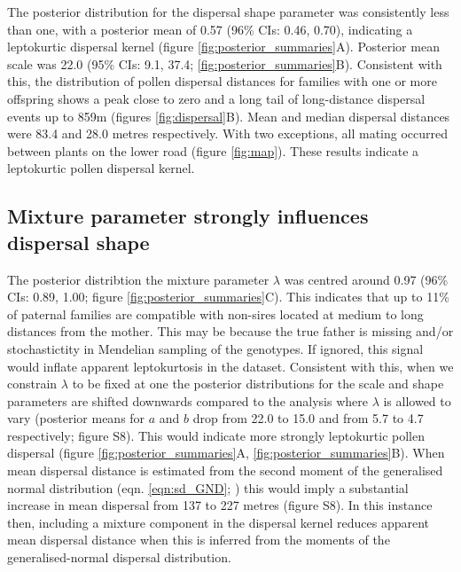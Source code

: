 \documentclass[10pt, a4paper, twocolumn]{article} %
\begin{document}
The posterior distribution for the dispersal shape parameter was consistently less than one, with a posterior mean of 0.57 (96\% CIs: 0.46, 0.70), indicating a leptokurtic dispersal kernel (figure \ref{fig:posterior_summaries}A).
Posterior mean scale was 22.0 (95\% CIs: 9.1, 37.4; \ref{fig:posterior_summaries}B).
Consistent with this, the distribution of pollen dispersal distances for families with one or more offspring shows a peak close to zero and a long tail of long-distance dispersal events up to 859m (figures \ref{fig:dispersal}B).
Mean and median dispersal distances were 83.4 and 28.0 metres respectively.
With two exceptions, all mating occurred between plants on the lower road (figure \ref{fig:map}).
These results indicate a leptokurtic pollen dispersal kernel.


\subsection{Mixture parameter strongly influences dispersal shape}

The posterior distribtion the mixture parameter $\lambda$ was centred around 0.97 (96\% CIs: 0.89, 1.00; figure \ref{fig:posterior_summaries}C).
This indicates that up to 11\% of paternal families are compatible with non-sires located at medium to long distances from the mother.
This may be because the true father is missing and/or stochastictity in Mendelian sampling of the genotypes.
If ignored, this signal would inflate apparent leptokurtosis in the dataset.
Consistent with this, when we constrain $\lambda$ to be fixed at one the posterior distributions for the scale and shape parameters are shifted downwards compared to the analysis where $\lambda$ is allowed to vary (posterior means for $a$ and $b$ drop from 22.0 to 15.0 and from 5.7 to 4.7 respectively; figure S8).
This would indicate more strongly leptokurtic pollen dispersal (figure \ref{fig:posterior_summaries}A, \ref{fig:posterior_summaries}B).
When mean dispersal distance is estimated from the second moment of the generalised normal distribution (eqn. \ref{eqn:sd_GND}; \cite{clark1998trees}) this would imply a substantial increase in mean dispersal from 137 to 227 metres (figure S8).
In this instance then, including a mixture component in the dispersal kernel reduces apparent mean dispersal distance when this is inferred from the moments of the generalised-normal dispersal distribution.
\end{document}

